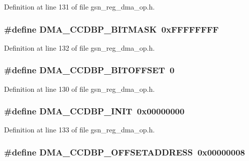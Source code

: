 Definition at line 131 of file gsn\_\-reg\_\-dma\_\-op.h.

\hypertarget{a00547_a275a38cf1823e3a27c3e0e91725466d4}{
\subsubsection[{DMA\_\-CCDBP\_\-BITMASK}]{\setlength{\rightskip}{0pt plus 5cm}\#define DMA\_\-CCDBP\_\-BITMASK~0xFFFFFFFF}}
\label{a00547_a275a38cf1823e3a27c3e0e91725466d4}


Definition at line 132 of file gsn\_\-reg\_\-dma\_\-op.h.

\hypertarget{a00547_a6e09a969715ff30c8d11bc90818a6ba4}{
\subsubsection[{DMA\_\-CCDBP\_\-BITOFFSET}]{\setlength{\rightskip}{0pt plus 5cm}\#define DMA\_\-CCDBP\_\-BITOFFSET~0}}
\label{a00547_a6e09a969715ff30c8d11bc90818a6ba4}


Definition at line 130 of file gsn\_\-reg\_\-dma\_\-op.h.

\hypertarget{a00547_af9d68df9474a8192e40826367158ed19}{
\subsubsection[{DMA\_\-CCDBP\_\-INIT}]{\setlength{\rightskip}{0pt plus 5cm}\#define DMA\_\-CCDBP\_\-INIT~0x00000000}}
\label{a00547_af9d68df9474a8192e40826367158ed19}


Definition at line 133 of file gsn\_\-reg\_\-dma\_\-op.h.

\hypertarget{a00547_a8f559ca9f5e7a90713050f67560878c2}{
\subsubsection[{DMA\_\-CCDBP\_\-OFFSETADDRESS}]{\setlength{\rightskip}{0pt plus 5cm}\#define DMA\_\-CCDBP\_\-OFFSETADDRESS~0x00000008}}
\label{a00547_a8f559ca9f5e7a90713050f67560878c2}


